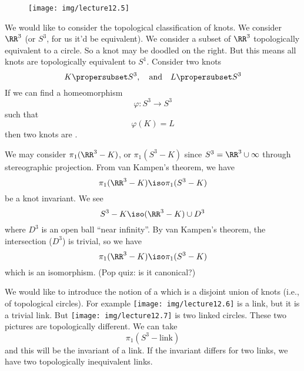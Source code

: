 \begin{wrapfigure}{r}{12pc}
  \vspace{-20pt}
  \texttt{[image: img/lecture12.5]}
\end{wrapfigure}
We would like to consider the topological classification of
knots. We consider $\RR^3$ (or $S^3$, for us it'd be
equivalent). We consider a subset of $\RR^3$ topologically
equivalent to a circle. So a knot may be doodled on the
right. But this means all knots are topologically equivalent to
$S^1$. Consider two knots 
\begin{equation}
K\propersubset S^3,\quad\mbox{and}\quad L\propersubset S^3
\end{equation}
If we can find a homeomorphism
\begin{equation}
\varphi\colon S^3\to S^3
\end{equation}
such that
\begin{equation}
\varphi(K)=L
\end{equation}
then two knots are .

We may consider $\pi_1(\RR^3-K)$, or $\pi_1(S^3-K)$ since
$S^3=\RR^3\cup\infty$ through stereographic projection. From van
Kampen's theorem, we have
\begin{equation}
\pi_1(\RR^3-K)\iso\pi_1(S^3-K)
\end{equation}
be a knot invariant. 
We see
\begin{equation}
S^3-K\iso(\RR^3-K)\cup D^3
\end{equation}
where $D^3$ is an open ball ``near infinity''. By van Kampen's
theorem, the intersection ($D^3$) is trivial, so we have
\begin{equation}
\pi_1(\RR^3-K)\iso\pi_1(S^3-K)
\end{equation}
which is an isomorphism. (Pop quiz: is it canonical?)

We would like to introduce the notion of a 
which is a disjoint union of knots (i.e., of topological
circles). For example {\centering\texttt{[image: img/lecture12.6]}}
is a link, but it is a trivial link. But \texttt{[image: img/lecture12.7]}
is two linked circles. These two pictures are topologically
different. We can take
\begin{equation*}
\pi_1(S^3-\mbox{link})
\end{equation*}
and this will be the invariant of a link. If the invariant
differs for two links, we have two topologically inequivalent links.
